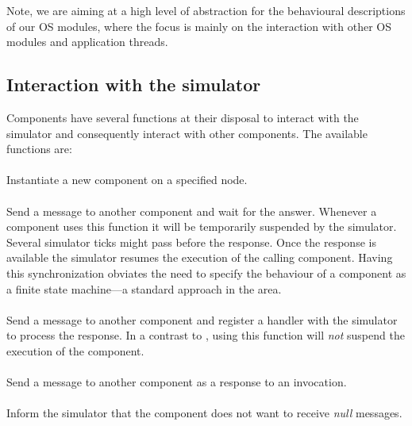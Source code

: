Note, we are aiming at a high level of abstraction for the behavioural descriptions of our OS modules, where the focus is mainly on the interaction with other OS modules and application threads.


\subsection{Interaction with the simulator}

Components have several functions at their disposal to interact with the simulator and consequently interact with other components.
The available functions are:

\paragraph{}
Instantiate a new component on a specified node.
\paragraph{}
Send a message to another component and wait for the answer.
Whenever a component uses this function it will be temporarily suspended by the simulator.
Several simulator ticks might pass before the %
response.
Once the response is
available the simulator resumes the execution of the calling component.
Having this synchronization obviates the need to specify the behaviour of a component as a finite state machine---a standard approach in the area.
\paragraph{}
Send a message to another component and register a handler with the simulator to process the response.
In a contrast to , using this function will \emph{not} suspend the execution of the component.
\paragraph{}
Send a message to another component as a response to an invocation.
\paragraph{}
Inform the simulator that the component does not want to receive
\emph{null} messages.
